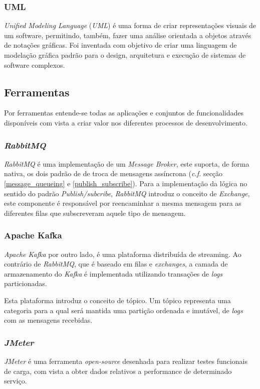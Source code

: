 \subsubsection{UML}

\emph{Unified Modeling Language} (\emph{UML}\label{sym:UML}) é uma forma de criar representações visuais de um software, permitindo, também, fazer uma análise orientada a objetos através de notações gráficas. Foi inventada com objetivo de criar uma linguagem de modelação gráfica padrão para o design, arquitetura e execução de sistemas de software complexos\cite{uml}.

\subsection{Ferramentas}
Por ferramentas entende-se todas as aplicações e conjuntos de funcionalidades disponíveis com vista a criar valor nos diferentes processos de desenvolvimento\cite{software_tools}.

\subsubsection{\emph{RabbitMQ}}
\emph{RabbitMQ} é uma implementação de um \emph{Message Broker}, este suporta, de forma nativa, os dois padrão de de troca de mensagens assíncrona (\emph{c.f.} secção \ref{message_queueing} e \ref{publish_subscribe}). Para a implementação da lógica no sentido do padrão \emph{Publish/subcribe}, \emph{RabbitMQ} introduz o conceito de \emph{Exchange}, este componente é responsável por reencaminhar a mesma mensagem para as diferentes filas que subscreveram aquele tipo de mensagem.

\subsubsection{Apache Kafka}
\emph{Apache Kafka} por outro lado, é uma plataforma distribuída de streaming. Ao contrário de \emph{RabbitMQ}, que é baseado em filas e \emph{exchanges}, a camada de armazenamento do \emph{Kafka} é implementada utilizando transações de \emph{logs} particionadas.

Esta plataforma introduz o conceito de tópico. Um tópico representa uma categoria para a qual será mantida uma partição ordenada e imutável, de \emph{logs} com as mensagens recebidas.

\subsubsection{\emph{JMeter} \label{estado_arte_jmeter}}
\emph{JMeter} é uma ferramenta \emph{open-source} desenhada para realizar testes funcionais de carga, com vista a obter dados relativos a performance de determinado serviço\cite{jmeter}.

